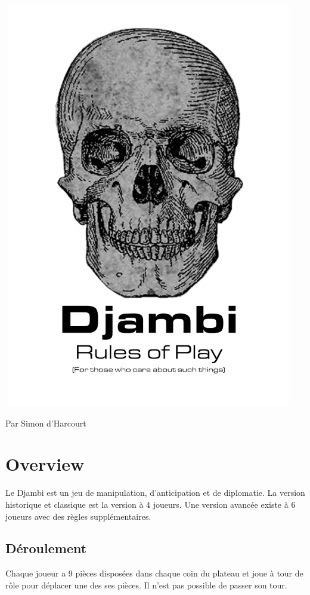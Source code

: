 \documentclass{article}
\begin{document}
\includegraphics[width=5in,height=7in]{media/image1.png}
\begin{center}
Par Simon d'Harcourt
\end{center}
\newpage


\section{Overview}
Le Djambi est un jeu de manipulation, d'anticipation et de diplomatie.
La version historique et classique est la version à 4 joueurs.
Une version avancée existe à 6 joueurs avec des règles supplémentaires.


\subsection{Déroulement}
Chaque joueur a 9 pièces disposées dans chaque coin du plateau et joue à tour de rôle pour déplacer une des ses pièces.
Il n'est pas possible de passer son tour.
\end{document}
